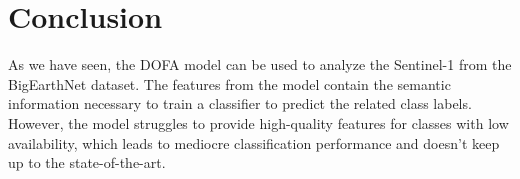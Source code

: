 \section{Conclusion}
\label{sec:conclusion}


As we have seen, the DOFA model can be used to analyze the Sentinel-1 from the BigEarthNet dataset. The features from the model contain the semantic information necessary to train a classifier to predict the related class labels. However, the model struggles to provide high-quality features for classes with low availability, which leads to mediocre classification performance and doesn't keep up to the state-of-the-art.